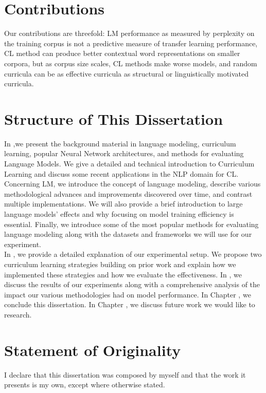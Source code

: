 \section{Contributions}
\label{chap:intro:sec:contributions}
Our contributions are threefold: LM performance as measured by perplexity on the training corpus is not a predictive measure of transfer learning performance, CL method can produce better contextual word representations on smaller corpora, but as corpus size scales, CL methods make worse models, and random curricula can be as effective curricula as structural or linguistically motivated curricula.
\section{Structure of This Dissertation}
\label{chap:intro:sec:structure}
In ,we present the background material in language modeling, curriculum learning, popular Neural Network architectures, and methods for evaluating Language Models. We give a detailed and technical introduction to Curriculum Learning and discuss some recent applications in the NLP domain for CL. Concerning LM, we introduce the concept of language modeling, describe various methodological advances and improvements discovered over time, and contrast multiple implementations. We will also provide a brief introduction to large language models' effects and why focusing on model training efficiency is essential. Finally, we introduce some of the most popular methods for evaluating language modeling along with the datasets and frameworks we will use for our experiment. \\
In , we provide a detailed explanation of our experimental setup. We propose two curriculum learning strategies building on prior work and explain how we implemented these strategies and how we evaluate the effectiveness. 
In , we discuss the results of our experiments along with a comprehensive analysis of the impact our various methodologies had on model performance.
In Chapter , we conclude this dissertation.
In Chapter , we discuss future work we would like to research.
\section{Statement of Originality}
\label{chap:intro:sec:statement}
I declare that this dissertation was composed by myself and that the work it presents is my own, except where otherwise stated.